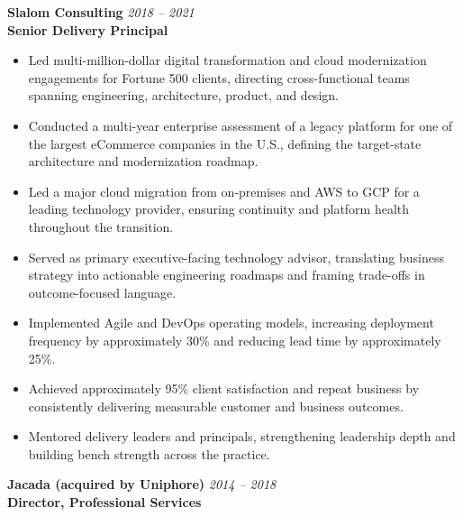 \documentclass[11pt]{article}
\begin{document}
\vspace{6pt}

\pagebreak

\textbf{Slalom Consulting} \hfill \textit{2018 -- 2021} \\
\textbf{Senior Delivery Principal}

\begin{itemize}
  \item Led multi-million-dollar digital transformation and cloud modernization engagements for Fortune 500 clients, directing cross-functional teams spanning engineering, architecture, product, and design.
  \item Conducted a multi-year enterprise assessment of a legacy platform for one of the largest eCommerce companies in the U.S., defining the target-state architecture and modernization roadmap.
  \item Led a major cloud migration from on-premises and AWS to GCP for a leading technology provider, ensuring continuity and platform health throughout the transition.
  \item Served as primary executive-facing technology advisor, translating business strategy into actionable engineering roadmaps and framing trade-offs in outcome-focused language.
  \item Implemented Agile and DevOps operating models, increasing deployment frequency by approximately 30\% and reducing lead time by approximately 25\%.
  \item Achieved approximately 95\% client satisfaction and repeat business by consistently delivering measurable customer and business outcomes.
  \item Mentored delivery leaders and principals, strengthening leadership depth and building bench strength across the practice.
\end{itemize}

\vspace{6pt}

\textbf{Jacada (acquired by Uniphore)} \hfill \textit{2014 -- 2018} \\
\textbf{Director, Professional Services}
\end{document}
